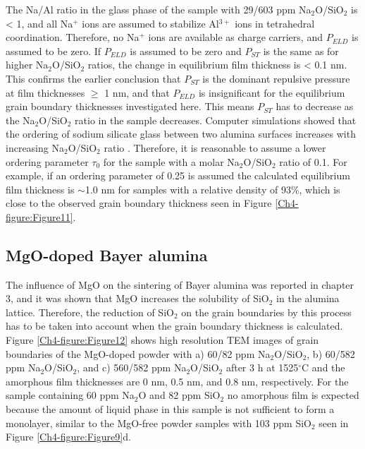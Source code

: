 The Na/Al ratio in the glass phase of the sample with 29/603 ppm Na$_{2}$O/SiO$_{2}$ is < 1, and all Na$^{+}$ ions are assumed to stabilize Al$^{3+}$ ions in tetrahedral coordination. Therefore, no Na$^{+}$ ions are available as charge carriers, and $P_{ELD}$ is assumed to be zero. If $P_{ELD}$ is assumed to be zero and $P_{ST}$ is the same as for higher Na$_{2}$O/SiO$_{2}$ ratios, the change in equilibrium film thickness is < 0.1 nm. This confirms the earlier conclusion that $P_{ST}$ is the dominant repulsive pressure at film thicknesses $\geq$ 1 nm, and that $P_{ELD}$ is insignificant for the equilibrium grain boundary thicknesses investigated here. This means $P_{ST}$ has to decrease as the Na$_{2}$O/SiO$_{2}$ ratio in the sample decreases. Computer simulations showed that the ordering of sodium silicate glass between two alumina surfaces increases with increasing Na$_{2}$O/SiO$_{2}$ ratio \cite{Litton1999}. Therefore, it is reasonable to assume a lower ordering parameter $\tau_{0}$ for the sample with a molar Na$_{2}$O/SiO$_{2}$ ratio of 0.1. For example, if an ordering parameter of 0.25 is assumed the calculated equilibrium film thickness is $\sim$1.0 nm for samples with a relative density of 93\%, which is close to the observed grain boundary thickness seen in Figure \ref{Ch4-figure:Figure11}.

\subsection{MgO-doped Bayer alumina}
The influence of MgO on the sintering of Bayer alumina was reported in chapter 3, and it was shown that MgO increases the solubility of SiO$_{2}$ in the alumina lattice. Therefore, the reduction of SiO$_{2}$ on the grain boundaries by this process has to be taken into account when the grain boundary thickness is calculated. Figure \ref{Ch4-figure:Figure12} shows high resolution TEM images of grain boundaries of the MgO-doped powder with a) 60/82 ppm Na$_{2}$O/SiO$_{2}$, b) 60/582 ppm Na$_{2}$O/SiO$_{2}$, and c) 560/582 ppm Na$_{2}$O/SiO$_{2}$ after 3 h at 1525$^{\circ}$C and the amorphous film thicknesses are 0 nm, 0.5 nm, and 0.8 nm, respectively. For the sample containing 60 ppm Na$_{2}$O and 82 ppm SiO$_{2}$ no amorphous film is expected because the amount of liquid phase in this sample is not sufficient to form a monolayer, similar to the MgO-free powder samples with 103 ppm SiO$_{2}$ seen in Figure \ref{Ch4-figure:Figure9}d. 

